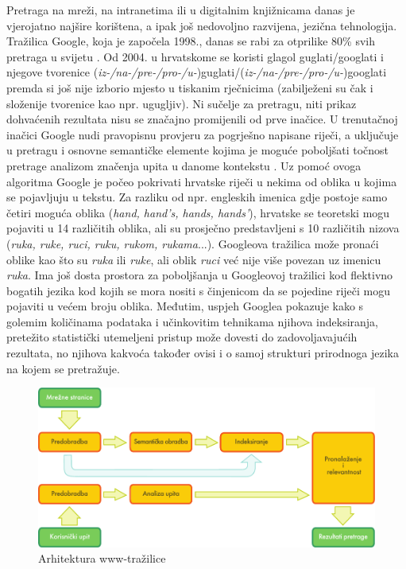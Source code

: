 \begin{multicols}{2}
Pretraga na mreži, na intranetima ili u digitalnim knjižnicama danas je vjerojatno najšire korištena, a ipak još nedovoljno razvijena, jezična tehnologija. Tražilica Google, koja je započela 1998., danas se rabi za otprilike 80\% svih pretraga u svijetu \cite{str14}. Od 2004. u hrvatskome se koristi glagol guglati/googlati i njegove tvorenice (\emph{iz-/na-/pre-/pro-/u-})guglati/(\emph{iz-/na-/pre-/pro-/u-})googlati premda si još nije izborio mjesto u tiskanim rječnicima (zabilježeni su čak i složenije tvorenice kao npr. ugugljiv). Ni sučelje za pretragu, niti prikaz dohvaćenih rezultata nisu se značajno promijenili od prve inačice. U trenutačnoj inačici Google nudi pravopisnu provjeru za pogrješno napisane riječi, a uključuje u pretragu i osnovne semantičke elemente kojima je moguće poboljšati točnost pretrage analizom značenja upita u danome kontekstu \cite{str15}. Uz pomoć ovoga algoritma Google je počeo pokrivati hrvatske riječi u nekima od oblika u kojima se pojavljuju u tekstu. Za razliku od npr. engleskih imenica gdje postoje samo četiri moguća oblika (\emph{hand, hand’s, hands, hands’}), hrvatske se teoretski mogu pojaviti u 14 različitih oblika, ali su prosječno predstavljeni s 10 različitih nizova (\emph{ruka, ruke, ruci, ruku, rukom, rukama}...). Googleova tražilica može pronaći oblike kao što su \emph{ruka} ili \emph{ruke}, ali oblik \emph{ruci} već nije više povezan uz imenicu \emph{ruka}. Ima još dosta prostora za poboljšanja u Googleovoj tražilici kod flektivno bogatih jezika kod kojih se mora nositi s činjenicom da se pojedine riječi mogu pojaviti u većem broju oblika. Međutim, uspjeh Googlea pokazuje kako s golemim količinama podataka i učinkovitim tehnikama njihova indeksiranja, pretežito statistički utemeljeni pristup može dovesti do zadovoljavajućih rezultata, no njihova kakvoća također ovisi i o samoj strukturi prirodnoga jezika na kojem se pretražuje.

\begin{figure}[htb]
  \center
  \includegraphics[width=\textwidth]{../_media/croatian/web_search_architecture}
  \caption{Arhitektura www-tražilice}
  \label{fig:websearcharch_cro}
\end{figure}


\end{multicols}
